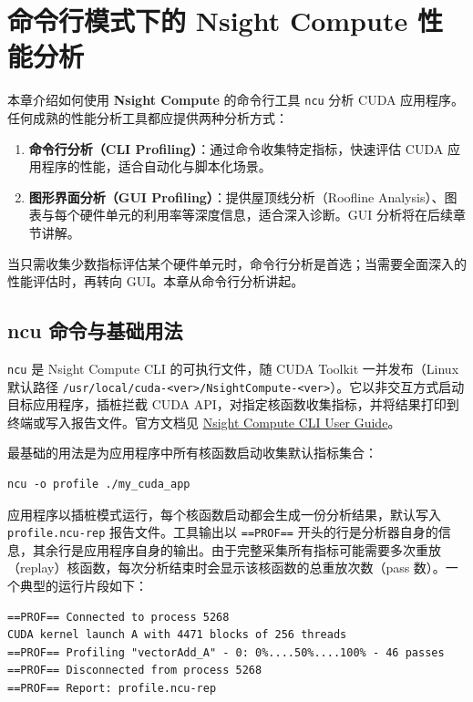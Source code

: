 \section{命令行模式下的 Nsight Compute 性能分析}

本章介绍如何使用 \textbf{Nsight Compute} 的命令行工具 \texttt{ncu} 分析 CUDA 应用程序。任何成熟的性能分析工具都应提供两种分析方式：

\begin{enumerate}
    \item \textbf{命令行分析（CLI Profiling）}：通过命令收集特定指标，快速评估 CUDA 应用程序的性能，适合自动化与脚本化场景。
    \item \textbf{图形界面分析（GUI Profiling）}：提供屋顶线分析（Roofline Analysis）、图表与每个硬件单元的利用率等深度信息，适合深入诊断。GUI 分析将在后续章节讲解。
\end{enumerate}

当只需收集少数指标评估某个硬件单元时，命令行分析是首选；当需要全面深入的性能评估时，再转向 GUI。本章从命令行分析讲起。

\subsection{ncu 命令与基础用法}

\texttt{ncu} 是 Nsight Compute CLI 的可执行文件，随 CUDA Toolkit 一并发布（Linux 默认路径 \texttt{/usr/local/cuda-<ver>/NsightCompute-<ver>}）。它以非交互方式启动目标应用程序，插桩拦截 CUDA API，对指定核函数收集指标，并将结果打印到终端或写入报告文件。官方文档见 \href{https://docs.nvidia.com/nsight-compute/NsightComputeCli/index.html}{Nsight Compute CLI User Guide}。

最基础的用法是为应用程序中所有核函数启动收集默认指标集合：

\begin{lstlisting}
ncu -o profile ./my_cuda_app
\end{lstlisting}

应用程序以插桩模式运行，每个核函数启动都会生成一份分析结果，默认写入 \texttt{profile.ncu-rep} 报告文件。工具输出以 \texttt{==PROF==} 开头的行是分析器自身的信息，其余行是应用程序自身的输出。由于完整采集所有指标可能需要多次重放（replay）核函数，每次分析结束时会显示该核函数的总重放次数（pass 数）。一个典型的运行片段如下：

\begin{lstlisting}
==PROF== Connected to process 5268
CUDA kernel launch A with 4471 blocks of 256 threads
==PROF== Profiling "vectorAdd_A" - 0: 0%....50%....100% - 46 passes
==PROF== Disconnected from process 5268
==PROF== Report: profile.ncu-rep
\end{lstlisting}

